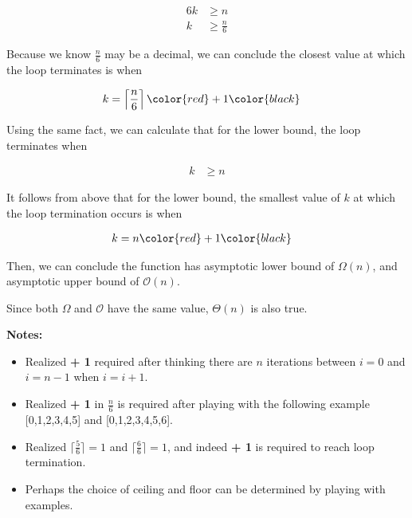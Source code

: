 \documentclass[12pt]{article}
\begin{document}
\begin{enumerate}[a.]
\begin{mdframed}
        \begin{align}
            6k &\geq n\\
            k &\geq \frac{n}{6}
        \end{align}

        Because we know $\frac{n}{6}$ may be a decimal, we can conclude the closest value at
        which the loop terminates is when

        \begin{align}
            k &= \left\lceil \frac{n}{6} \right\rceil \color{red}+1\color{black}
        \end{align}

        \bigskip

        Using the same fact, we can calculate that for the lower bound, the loop
        terminates when

        \begin{align}
            k &\geq n
        \end{align}

        It follows from above that for the lower bound, the smallest value of $k$ at which
        the loop termination occurs is when

        \begin{align}
            k &= n \color{red}+1\color{black}
        \end{align}

        \bigskip

        Then, we can conclude the function has asymptotic lower bound of $\Omega(n)$, and
        asymptotic upper bound of $\mathcal{O}(n)$.

        \bigskip

        Since both $\Omega$ and $\mathcal{O}$ have the same value, $\Theta(n)$
        is also true.

    \end{mdframed}

    \bigskip

    \textbf{Notes:}

    \begin{itemize}
        \item Realized \textbf{+ 1} required after thinking there are $n$ iterations
        between $i = 0$ and $i = n - 1$ when $i = i + 1$.

        \item Realized \textbf{+ 1} in $\frac{n}{6}$ is required after playing
        with the following example [0,1,2,3,4,5] and [0,1,2,3,4,5,6].

        \item Realized $\lceil \frac{5}{6} \rceil = 1$ and $\lceil \frac{6}{6} \rceil = 1$,
        and indeed \textbf{+ 1} is required to reach loop termination.

        \item Perhaps the choice of ceiling and floor can be determined by playing with examples.

    \end{itemize}

\end{enumerate}
\end{document}
